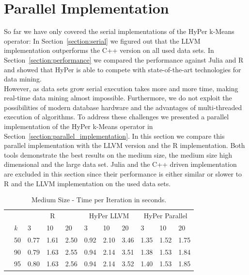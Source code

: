 \FloatBarrier

\section{Parallel Implementation}\label{section:parallel}


So far we have only covered the serial implementations of the HyPer k-Means operator: In Section~\ref{section:serial}  we figured out that the LLVM implementation outperforms the C++ version on all used data sets. In Section~\ref{section:performance} we compared the performance against Julia and R and showed that HyPer is able to compete with state-of-the-art technologies for data mining.
\\
However, as data sets grow serial execution takes more and more time, making real-time data mining almost impossible. Furthermore, we do not exploit the possibilities of modern database hardware and the advantages of multi-threaded execution of algorithms. To address these challenges we presented a parallel implementation of the HyPer k-Means operator in Section~\ref{section:parallel_implementation}. In this section we compare this parallel implementation with the LLVM version and the R implementation. Both tools demonstrate the best results on the medium size, the medium size high dimensional and the large data set. Julia and the C++ driven implementation are excluded in this section since their performance is either similar or slower to R and the LLVM implementation on the used data sets.

\begin{table}[htsb]
  \caption[Medium Size - Time per Iteration (Parallel)]{Medium Size - Time per Iteration in seconds.}
  \label{tab:medium_final}
  \centering
  \begin{tabular}{l l l ll |l l l |l l l }
    \toprule
      && \multicolumn{3}{c}{R} & \multicolumn{3}{c}{HyPer LLVM} & \multicolumn{3}{c}{HyPer Parallel}  \\
      &\emph{k} & 3 & 10 & 20 & 3 & 10 & 20 & 3 & 10 & 20 \\
    \midrule
      \parbox[t]{2mm}{} &50  & 0.77 & 1.61 & 2.50 & 0.92 & 2.10 & 3.46 & 1.35 & 1.52 & 1.75 \\
      &90  & 0.79 & 1.63 & 2.55 & 0.94 & 2.14 & 3.51 & 1.38 & 1.53 & 1.84 \\
      &95  & 0.80 & 1.63 & 2.56 & 0.94 & 2.14 & 3.52 & 1.40 & 1.53 & 1.85 \\
    \bottomrule
  \end{tabular}
\end{table}

